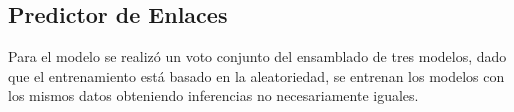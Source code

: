 \documentclass[a4paper,11pt,twocolumn,twoside]{article}
\begin{document}
\subsection{Predictor de Enlaces}


Para el modelo se realizó un voto conjunto del ensamblado de tres modelos, dado que el entrenamiento 
está basado en la aleatoriedad, se entrenan los modelos con los mismos datos obteniendo inferencias no
necesariamente iguales.


\end{document}

